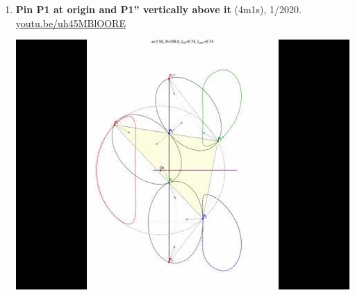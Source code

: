 \documentclass[12pt]{article}
\begin{document}
\begin{enumerate}[resume]
% 
\item \textbf{Pin P1 at origin and P1'' vertically above it} (4m1s), 1/2020. \href{https://youtu.be/uh45MBlOORE}{\url{youtu.be/uh45MBlOORE}}
\begin{center}\includegraphics[width=.5\textwidth]{pics/uh45MBlOORE.jpg}\end{center}
% 
\end{enumerate}




\end{document}
